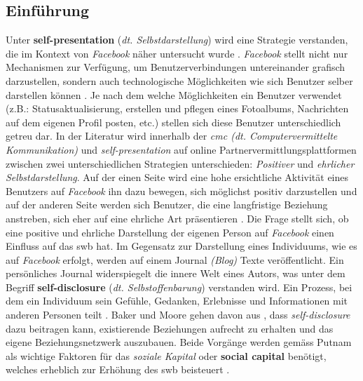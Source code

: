 \subsection{Einführung}\label{subsec.selfpEinführung}
Unter \textbf{self-presentation} (\textit{dt. Selbstdarstellung}) wird eine Strategie verstanden, die im Kontext von \textit{Facebook} näher untersucht wurde \cite[S.359ff]{Kim:2011}. \textit{Facebook} stellt nicht nur Mechanismen zur Verfügung, um Benutzerverbindungen untereinander grafisch darzustellen, sondern auch technologische Möglichkeiten wie sich Benutzer selber darstellen können \cite{Ellison:2007.1}. Je nach dem welche Möglichkeiten ein Benutzer verwendet (z.B.: Statusaktualisierung, erstellen und pflegen eines Fotoalbums, Nachrichten auf dem eigenen Profil posten, etc.) stellen sich diese Benutzer unterschiedlich getreu dar. In der Literatur wird innerhalb der \textit{\gls{cmc} (dt. Computervermittelte Kommunikation)} \cite{Tidwell:2002} und \textit{self-presentation} auf online Partnervermittlungsplattformen \cite{Gibbs:2006} zwischen zwei unterschiedlichen Strategien unterschieden: \textit{Positiver} und \textit{ehrlicher Selbstdarstellung}. Auf der einen Seite wird eine hohe ersichtliche Aktivität eines Benutzers auf \textit{Facebook} ihn dazu bewegen, sich möglichst positiv darzustellen \cite{Kimmerle:2008} und auf der anderen Seite werden sich Benutzer, die eine langfristige Beziehung anstreben, sich eher auf eine ehrliche Art präsentieren \cite{Gibbs:2006}. Die Frage stellt sich, ob eine positive und ehrliche Darstellung der eigenen Person auf \textit{Facebook} einen Einfluss auf das \gls{swb} hat.\newline
Im Gegensatz zur Darstellung eines Individuums, wie es auf \textit{Facebook} erfolgt, werden auf einem Journal \textit{(Blog)} Texte veröffentlicht. Ein persönliches Journal widerspiegelt die innere Welt eines Autors, was unter dem Begriff \textbf{self-disclosure} (\textit{dt. Selbstoffenbarung}) verstanden wird. Ein Prozess, bei dem ein Individuum sein Gefühle, Gedanken, Erlebnisse und Informationen mit anderen Personen teilt \cite{Derlega:1993}. Baker und Moore gehen davon aus \cite{Baker:2008}, dass \textit{self-disclosure} dazu beitragen kann, existierende Beziehungen aufrecht zu erhalten und das eigene Beziehungsnetzwerk auszubauen. Beide Vorgänge werden gemäss Putnam \cite{Putnam:2000} als wichtige Faktoren für das \textit{soziale Kapital} oder \textbf{social capital} benötigt, welches erheblich zur Erhöhung des \gls{swb} beisteuert \cite{Sirgy:2006}.
